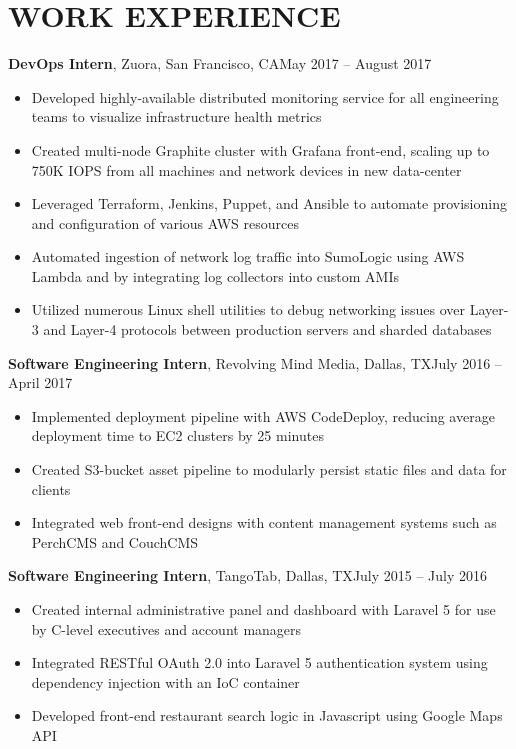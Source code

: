 \documentclass{resume}
\begin{document}
\maketitle

\section{WORK EXPERIENCE}

\textbf{DevOps Intern}, Zuora, San Francisco, CA\hfill{May 2017 -- August 2017}
\begin{itemize}\itemsep0.3em
\item Developed highly-available distributed monitoring service for all engineering teams to visualize infrastructure health metrics
\item Created multi-node Graphite cluster with Grafana front-end, scaling up to 750K IOPS from all machines and network devices in new data-center
\item Leveraged Terraform, Jenkins, Puppet, and Ansible to automate provisioning and configuration of various AWS resources
\item Automated ingestion of network log traffic into SumoLogic using AWS Lambda and by integrating log collectors into custom AMIs
\item Utilized numerous Linux shell utilities to debug networking issues over Layer-3 and Layer-4 protocols between production servers and sharded databases
\end{itemize}\vspace{5pt}

\textbf{Software Engineering Intern}, Revolving Mind Media, Dallas, TX\hfill{July 2016 -- April 2017}
\begin{itemize}\itemsep0.3em
\item Implemented deployment pipeline with AWS CodeDeploy, reducing average deployment time to EC2 clusters by 25 minutes
\item Created S3-bucket asset pipeline to modularly persist static files and data for clients
\item Integrated web front-end designs with content management systems such as PerchCMS and CouchCMS
\end{itemize}\vspace{5pt}

\textbf{Software Engineering Intern}, TangoTab, Dallas, TX\hfill{July 2015 -- July 2016}
\begin{itemize}\itemsep0.3em
\item Created internal administrative panel and dashboard with Laravel 5 for use by C-level executives and account managers
\item Integrated RESTful OAuth 2.0 into Laravel 5 authentication system using dependency injection with an IoC container
\item Developed front-end restaurant search logic in Javascript using Google Maps API
\end{itemize}\vspace{5pt}
\end{document}

